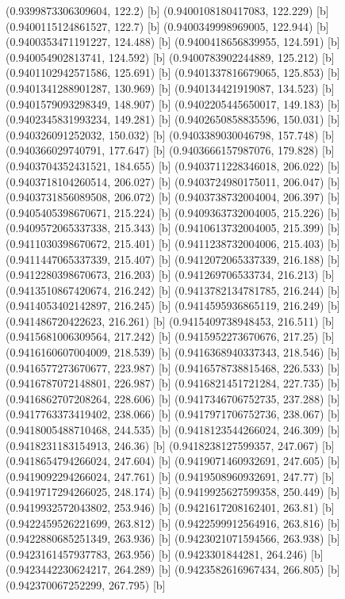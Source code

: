 {{{(0.9399873306309604, 122.2) [b] 
(0.9400108180417083, 122.229) [b] 
(0.9400115124861527, 122.7) [b] 
(0.9400349998969005, 122.944) [b] 
(0.9400353471191227, 124.488) [b] 
(0.9400418656839955, 124.591) [b] 
(0.940054902813741, 124.592) [b] 
(0.9400783902244889, 125.212) [b] 
(0.9401102942571586, 125.691) [b] 
(0.9401337816679065, 125.853) [b] 
(0.9401341288901287, 130.969) [b] 
(0.940134421919087, 134.523) [b] 
(0.9401579093298349, 148.907) [b] 
(0.9402205445650017, 149.183) [b] 
(0.9402345831993234, 149.281) [b] 
(0.9402650858835596, 150.031) [b] 
(0.940326091252032, 150.032) [b] 
(0.9403389030046798, 157.748) [b] 
(0.940366029740791, 177.647) [b] 
(0.9403666157987076, 179.828) [b] 
(0.9403704352431521, 184.655) [b] 
(0.9403711228346018, 206.022) [b] 
(0.9403718104260514, 206.027) [b] 
(0.9403724980175011, 206.047) [b] 
(0.9403731856089508, 206.072) [b] 
(0.9403738732004004, 206.397) [b] 
(0.9405405398670671, 215.224) [b] 
(0.9409363732004005, 215.226) [b] 
(0.9409572065337338, 215.343) [b] 
(0.9410613732004005, 215.399) [b] 
(0.9411030398670672, 215.401) [b] 
(0.9411238732004006, 215.403) [b] 
(0.9411447065337339, 215.407) [b] 
(0.9412072065337339, 216.188) [b] 
(0.9412280398670673, 216.203) [b] 
(0.941269706533734, 216.213) [b] 
(0.9413510867420674, 216.242) [b] 
(0.9413782134781785, 216.244) [b] 
(0.9414053402142897, 216.245) [b] 
(0.9414595936865119, 216.249) [b] 
(0.941486720422623, 216.261) [b] 
(0.9415409738948453, 216.511) [b] 
(0.9415681006309564, 217.242) [b] 
(0.9415952273670676, 217.25) [b] 
(0.9416160607004009, 218.539) [b] 
(0.9416368940337343, 218.546) [b] 
(0.9416577273670677, 223.987) [b] 
(0.9416578738815468, 226.533) [b] 
(0.9416787072148801, 226.987) [b] 
(0.9416821451721284, 227.735) [b] 
(0.9416862707208264, 228.606) [b] 
(0.9417346706752735, 237.288) [b] 
(0.9417763373419402, 238.066) [b] 
(0.9417971706752736, 238.067) [b] 
(0.9418005488710468, 244.535) [b] 
(0.9418123544266024, 246.309) [b] 
(0.9418231183154913, 246.36) [b] 
(0.9418238127599357, 247.067) [b] 
(0.9418654794266024, 247.604) [b] 
(0.9419071460932691, 247.605) [b] 
(0.9419092294266024, 247.761) [b] 
(0.9419508960932691, 247.77) [b] 
(0.9419717294266025, 248.174) [b] 
(0.9419925627599358, 250.449) [b] 
(0.9419932572043802, 253.946) [b] 
(0.9421617208162401, 263.81) [b] 
(0.9422459526221699, 263.812) [b] 
(0.9422599912564916, 263.816) [b] 
(0.9422880685251349, 263.936) [b] 
(0.9423021071594566, 263.938) [b] 
(0.9423161457937783, 263.956) [b] 
(0.9423301844281, 264.246) [b] 
(0.9423442230624217, 264.289) [b] 
(0.9423582616967434, 266.805) [b] 
(0.942370067252299, 267.795) [b] 
}}}
